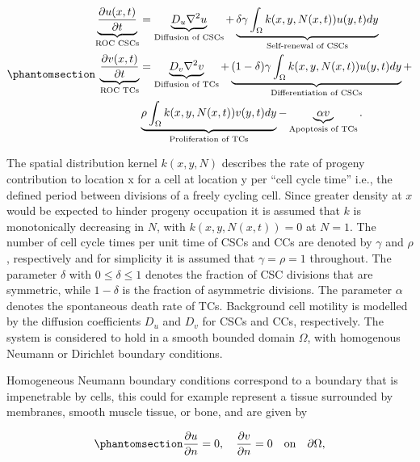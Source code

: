 \documentclass[
  letterpaper,
]{scrreprt}
\theoremstyle{definition}
\theoremstyle{remark}
\begin{document}
\begin{equation}\phantomsection\label{eq-integro-differential-CSC-model}{
\begin{aligned}
    \underbrace{\frac{\partial u(x,t)}{\partial t}}_\text{ROC CSCs} &= \underbrace{D_u \nabla^2 u}_\text{Diffusion of CSCs} + \underbrace{\delta \gamma \int_{\Omega} k(x,y,N(x,t))u(y,t) dy}_\text{Self-renewal of CSCs} \\
    \underbrace{\frac{\partial v(x,t)}{\partial t}}_\text{ROC TCs} &= \underbrace{D_v \nabla^2 v}_\text{Diffusion of TCs} + \underbrace{(1-\delta) \gamma \int_{\Omega} k(x,y,N(x,t))u(y,t) dy}_\text{Differentiation of CSCs} + \\
    & \underbrace{\rho \int_{\Omega} k(x,y,N(x,t))v(y,t) dy}_\text{Proliferation of TCs} - \underbrace{\alpha v}_\text{Apoptosis of TCs}.
\end{aligned}
}\end{equation}

The spatial distribution kernel \(k(x,y,N)\) describes the rate of
progeny contribution to location x for a cell at location y per ``cell
cycle time'' i.e., the defined period between divisions of a freely
cycling cell. Since greater density at \(x\) would be expected to hinder
progeny occupation it is assumed that \(k\) is monotonically decreasing
in \(N\), with \(k(x,y,N(x,t))=0\) at \(N=1\). The number of cell cycle
times per unit time of CSCs and CCs are denoted by \(\gamma\) and
\(\rho\), respectively and for simplicity it is assumed that
\(\gamma = \rho = 1\) throughout. The parameter \(\delta\) with
\(0 \leq \delta \leq 1\) denotes the fraction of CSC divisions that are
symmetric, while \(1-\delta\) is the fraction of asymmetric divisions.
The parameter \(\alpha\) denotes the spontaneous death rate of TCs.
Background cell motility is modelled by the diffusion coefficients
\(D_u\) and \(D_v\) for CSCs and CCs, respectively. The system is
considered to hold in a smooth bounded domain \(\Omega\), with
homogenous Neumann or Dirichlet boundary conditions.

Homogeneous Neumann boundary conditions correspond to a boundary that is
impenetrable by cells, this could for example represent a tissue
surrounded by membranes, smooth muscle tissue, or bone, and are given by

\begin{equation}\phantomsection\label{eq-homogeneous-neumann-boundary-conditions}{
\frac{\partial u}{\partial n} = 0, \quad \frac{\partial v}{\partial n} = 0 \quad \text{on} \quad \partial \Omega,
}\end{equation}
\end{document}
